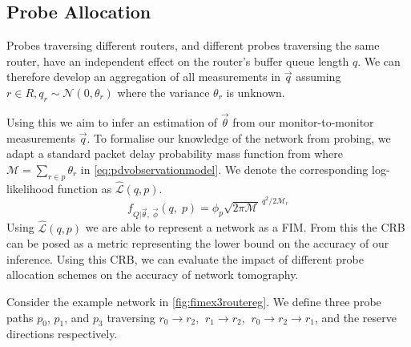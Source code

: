 \subsection{Probe Allocation}
\label{ssec:Mprobeallocation}
Probes traversing different routers, and different probes traversing the same router, have an independent effect on the router's buffer queue length $q$. We can therefore develop an aggregation of all measurements in $\vec{q}$ assuming $r\in R, q_r \sim \mathcal{N}(0, \theta_r)$ where the variance $\theta_r$ is unknown.\par
Using this we aim to infer an estimation of $\vec{\theta}$ from our monitor-to-monitor measurements $\vec{q}$. To formalise our knowledge of the network from probing, we adapt a standard packet delay probability mass function from \cite{he_network_2021} where $\mathcal{M} = \sum_{r\in p}\theta_r$ in \cref{eq:pdvobservationmodel}. We denote the corresponding log-likelihood function as $\widehat{\mathcal{L}}(q, p)$.
\begin{equation}
\label{eq:pdvobservationmodel}
    f_{Q|\vec{\theta},\; \vec{\phi}}(q,\;p) = \phi_p \sqrt{2\pi\mathcal{M}}^{\ q^2/{2\mathcal{M}_r}}
\end{equation}
Using $\widehat{\mathcal{L}}(q, p)$ we are able to represent a network as a FIM. From this the CRB can be posed as a metric representing the lower bound on the accuracy of our inference. Using this CRB, we can evaluate the impact of different probe allocation schemes on the accuracy of network tomography.\par
Consider the example network in \cref{fig:fimex3routereg}. We define three probe paths $p_0$, $p_1$, and $p_3$ traversing $r_0\rightarrow r_2$, $\ r_1\rightarrow r_2$, $\ r_0\rightarrow r_2\rightarrow r_1$, and the reserve directions respectively.
